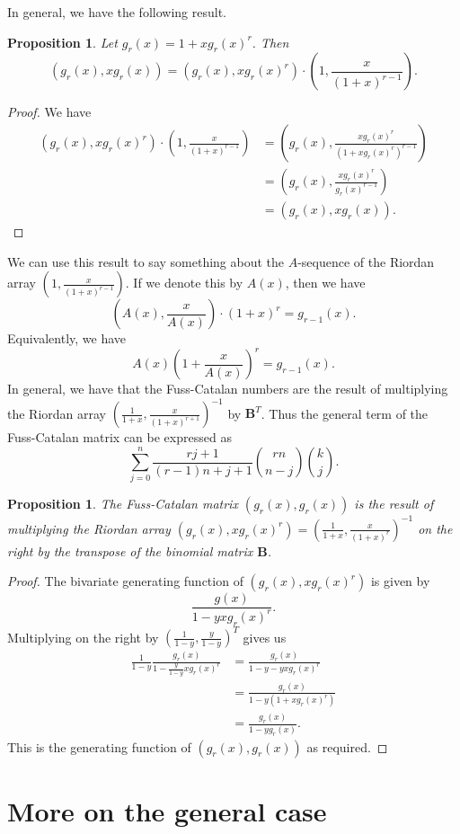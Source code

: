 \documentclass[12pt,reqno]{article}
\newtheorem{proposition}[theorem]{Proposition}
\theoremstyle{definition}
\begin{document}
In general, we have the following result.
\begin{proposition} Let $g_r(x)=1+xg_r(x)^r$. Then
$$(g_r(x), x g_r(x))=(g_r(x), x g_r(x)^r)\cdot \left(1, \frac{x}{(1+x)^{r-1}}\right).$$
\end{proposition}
\begin{proof}
We have
\begin{align*}
(g_r(x), x g_r(x)^r)\cdot \left(1, \frac{x}{(1+x)^{r-1}}\right)&=\left(g_r(x), \frac{xg_r(x)^r}{(1+xg_r(x)^r)^{r-1}}\right)\\
&=\left(g_r(x), \frac{xg_r(x)^r}{g_r(x)^{r-1}}\right)\\
&=(g_r(x), x g_r(x)).\end{align*}
\end{proof}
We can use this result to say something about the $A$-sequence of the Riordan array $\left(1, \frac{x}{(1+x)^{r-1}}\right)$. If we denote this by $A(x)$, then we have
$$\left(A(x), \frac{x}{A(x)}\right)\cdot (1+x)^r=g_{r-1}(x).$$ Equivalently, we have
$$A(x)\left(1+\frac{x}{A(x)}\right)^r = g_{r-1}(x).$$
In general, we have that the Fuss-Catalan numbers are the result of multiplying the Riordan array $\left(\frac{1}{1+x}, \frac{x}{(1+x)^{r+1}}\right)^{-1}$ by $\mathbf{B}^T$. Thus the general term of the Fuss-Catalan matrix can be expressed as
$$\sum_{j=0}^n \frac{rj+1}{(r-1)n+j+1} \binom{rn}{n-j}\binom{k}{j}.$$
\begin{proposition} The Fuss-Catalan matrix $(g_r(x), g_r(x))$ is the result of multiplying the Riordan array $(g_r(x), x g_r(x)^r)=\left(\frac{1}{1+x}, \frac{x}{(1+x)^r}\right)^{-1}$ on the right by the transpose of the binomial matrix $\mathbf{B}$.
\end{proposition}
\begin{proof} The bivariate generating function of $(g_r(x), x g_r(x)^r)$ is given by
$$\frac{g(x)}{1-yxg_r(x)^r}.$$ Multiplying on the right by $\left(\frac{1}{1-y}, \frac{y}{1-y}\right)^T$ gives us
\begin{align*}\frac{1}{1-y} \frac{g_r(x)}{1-\frac{y}{1-y}xg_r(x)^r}&=\frac{g_r(x)}{1-y-yxg_r(x)^r}\\
&=\frac{g_r(x)}{1-y(1+xg_r(x)^r)}\\
&=\frac{g_r(x)}{1-yg_r(x)}.\end{align*}
This is the generating function of $(g_r(x), g_r(x))$ as required.
\end{proof}

\section{More on the general case}
\end{document}
